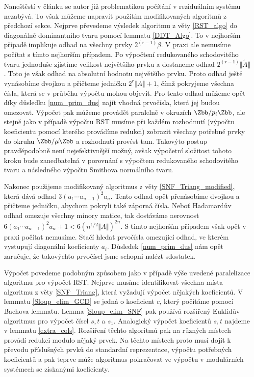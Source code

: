 Naneštěstí v článku \cite{SNF_Arne} se autor již problematikou počítání v
reziduálním systému nezabývá. To však můžeme napravit použitím modifikovaných
algoritmů z předchozí sekce. Nejprve převedeme výsledek algoritmu z věty 
\ref{RST_algo} do diagonálně dominantního tvaru pomocí lemmatu \ref{DDT_Algo}.
To v nejhorším případě implikuje odhad na všechny prvky $ 2^(r - 1) \beta $.
V praxi ale nemusíme počítat s tímto nejhorším případem. Po výpočtení 
redukovaného schodovitého tvaru jednoduše zjistíme velikost největšího prvku 
a dostaneme odhad $ 2^(r - 1) \Vert \tilde{A} \Vert $. Toto je však odhad na 
absolutní hodnotu největšího prvku. Proto odhad ještě vynásobíme dvojkou a 
přičteme jedničku $ 2^r \Vert A \Vert + 1 $, čímž pokryjeme všechna čísla, 
která se v průběhu výpočtu mohou objevit. Pro tento odhad můžeme opět díky 
důsledku \ref{num_prim_dus} najít vhodná prvočísla, která jej budou omezovat.
Výpočet pak můžeme provádět paralelně v okruzích $ \Zbb / p_i \Zbb $, ale stejně
jako v případě výpočtu RST musíme při každém rozhodnutí (výpočtu koeficientu
pomocí kterého provádíme redukci) zobrazit všechny potřebné prvky do okruhu
$ \Zbb / \mu \Zbb $ a rozhodnutí provést tam. Takovýto postup pravděpodobně není
nejefektivnější možný, avšak výpočetní složitost tohoto kroku bude zanedbatelná
v porovnání s výpočtem redukovaného schodovitého tvaru a následného výpočtu 
Smithova normálního tvaru.

Nakonec použijeme modifikovaný algoritmus z věty \ref{SNF_Triang_modified}, 
která dává odhad $ 3 (a_1 \cdots a_{n - 1})^2 a_n $. Tento odhad opět přenásobíme
dvojkou a přičteme jedničku, abychom pokryli také záporná čísla. Neboť 
Hadamardův odhad omezuje všechny minory matice, tak dostáváme nerovnost
$ 6 (a_1 \cdots a_{n - 1})^2 a_n + 1 < 6 (n^{1/2} \Vert A \Vert)^{2 n} $. S 
tímto nejhorším případem však opět v praxi počítat nemusíme. Stačí hledat 
prvočísla omezující odhad, ve kterém vystupují diagonální koeficienty $ a_i $.
Důsledek \ref{num_prim_dus} nám opět zaručuje, že takovýchto prvočísel jsme 
schopni nalézt sdostatek.

Výpočet povedeme podobným způsobem jako v případě výše uvedené paralelizace 
algoritmu pro výpočet RST. 
Nejprve musíme identifikovat všechna místa algoritmu z věty \ref{SNF_Triang},
která vyžadují výpočet nějakých koeficientů. V lemmatu \ref{Sloup_elim_GCD}
se jedná o koeficient $ c $, který počítáme pomocí Bachova lemmatu. Lemma
\ref{Sloup_elim_SNF} pak používá rozšířený Euklidův algoritmus pro výpočet čísel
$ s, t $ a $ s_1 $. Analogický výpočet koeficientů $ s, t $ najdeme v lemmatu
\ref{extra_cols}. Rozšíření těchto algoritmů pak na různých místech provádí 
redukci modulo nějaký prvek. Na těchto místech proto musí dojít k
převodu příslušných prvků do standardní reprezentace, výpočtu potřebných
koeficientů a pak teprve může algoritmus pokračovat ve výpočtu v modulárních
systémech se získanými koeficienty.

